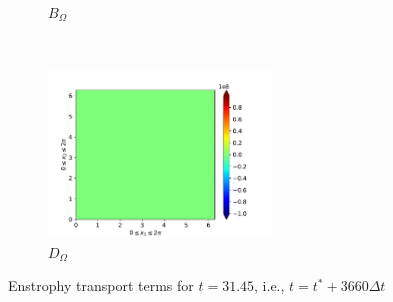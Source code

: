 \begin{figure}[H]
\begin{subfigure}{0.45\textwidth}
        \caption{$B_{\Omega}$}
    \end{subfigure}
    ~
    \begin{subfigure}{0.45\textwidth}
        \includegraphics[height=1.75in]{media/run-cds-65-5k/D-enst-4750.png}
        \caption{$D_{\Omega}$}
    \end{subfigure}
    \caption{Enstrophy transport terms for $t=31.45$, i.e., $t=t^{\ast} + 3660 \Delta t$}
\end{figure}

\newpage

